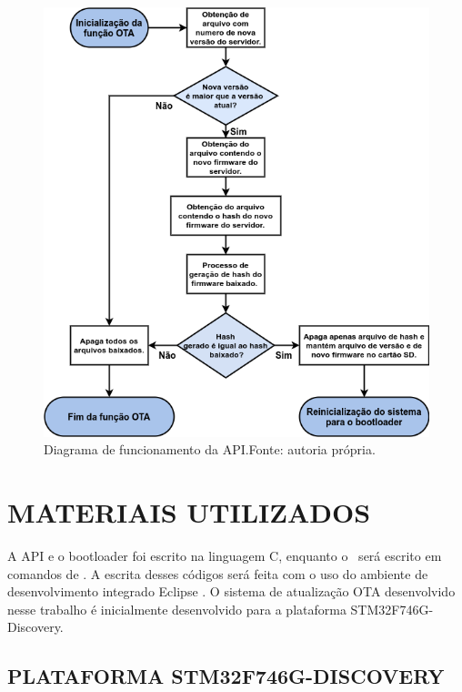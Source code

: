 \begin{figure}[H]
    \scriptsize
     \centering
     \includegraphics[scale=0.75]{dados/figuras/FuncionamentoAPI.png}
     \caption{Diagrama de funcionamento da API.\newline Fonte: autoria própria.}
     \label{fig:DiagAPI}
\end{figure}
\section{MATERIAIS UTILIZADOS}

A API e o bootloader foi escrito na linguagem C, enquanto o \linker\ será escrito em comandos de \linker. A escrita desses códigos será feita com o uso do ambiente de desenvolvimento integrado Eclipse \cite{Eclipse}. O sistema de atualização OTA desenvolvido nesse trabalho é inicialmente desenvolvido para a plataforma STM32F746G-Discovery.

\subsection{PLATAFORMA STM32F746G-DISCOVERY}

